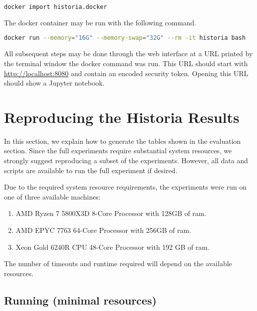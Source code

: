 \documentclass{acmart} %
\begin{document}
\begin{lstlisting}[language=bash]
  docker import historia.docker
\end{lstlisting}

The docker container may be run with the following command.   
\begin{lstlisting}[language=bash]
  docker run --memory="16G" --memory-swap="32G" --rm -it historia bash
\end{lstlisting}


All subsequent steps may be done through the web interface at a URL printed by the terminal window the docker command was run. This URL should start with \url{http://localhost:8080} and contain an encoded security token.  Opening this URL should show a Jupyter notebook.

\section{Reproducing the Historia Results}

In this section, we explain how to generate the tables shown in the evaluation section.
Since the full experiments require substantial system resources, we strongly suggest reproducing a subset of the experiments.  However, all data and scripts are available to run the full experiment if desired.

Due to the required system resource requirements, the experiments were run on one of three available machines:
\begin{enumerate}
    \item AMD Ryzen 7 5800X3D 8-Core Processor with 128GB of ram.
    \item AMD EPYC 7763 64-Core Processor with 256GB of ram.
    \item Xeon Gold 6240R CPU 48-Core Processor with 192 GB of ram.
\end{enumerate}
The number of timeouts and runtime required will depend on the available resources.



\subsection{Running  (minimal resources)}
\end{document}

